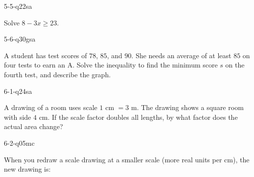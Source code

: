 \begin{practiceQuestion}{5-5-q22}{sa}
\begin{questionText}
Solve $8 - 3x \geq 23$.
\end{questionText}
\end{practiceQuestion}

\begin{practiceQuestion}{5-6-q30}{gsa}
\begin{questionText}
A student has test scores of $78$, $85$, and $90$. She needs an average of at least $85$ on four tests to earn an A. Solve the inequality to find the minimum score $s$ on the fourth test, and describe the graph.

\begin{center}
\end{center}
\end{questionText}
\end{practiceQuestion}

\begin{practiceQuestion}{6-1-q24}{sa}
\begin{questionText}
A drawing of a room uses scale $1$ cm $= 3$ m. The drawing shows a square room with side $4$ cm. If the scale factor doubles all lengths, by what factor does the actual area change?
\end{questionText}
\end{practiceQuestion}

\begin{practiceQuestion}{6-2-q05}{mc}
\begin{questionText}
When you redraw a scale drawing at a smaller scale (more real units per cm), the new drawing is:
\end{questionText}
\end{practiceQuestion}

